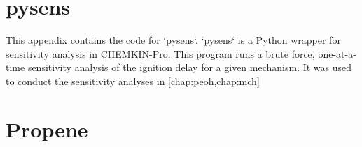 \documentclass[12pt,letterpaper,oneside,final]{book}
\begin{document}
\begin{appendices}


\chapter{pysens}
\label{app:pysens}
This appendix contains the code for `pysens`. `pysens` is a Python wrapper
for sensitivity analysis in CHEMKIN-Pro. This program runs a brute
force, one-at-a-time sensitivity analysis of the ignition delay for a
given mechanism. It was used to conduct the sensitivity analyses in
\cref{chap:peoh,chap:mch}

\blankline



\chapter{Propene}
\label{app:propene}


\end{appendices}
\end{document}
